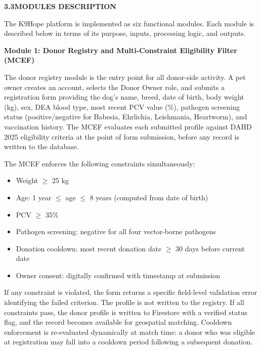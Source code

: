 \documentclass[12pt,a4paper]{article}
\begin{document}
\vspace{2em}
\noindent\textbf{3.3\quad MODULES DESCRIPTION}
\vspace{0.8em}

\noindent The K9Hope platform is implemented as six functional modules. Each module is described below in terms of its purpose, inputs, processing logic, and outputs.

\vspace{1em}
\noindent\textbf{Module 1: Donor Registry and Multi-Constraint Eligibility Filter (MCEF)}
\vspace{0.5em}

\noindent The donor registry module is the entry point for all donor-side activity. A pet owner creates an account, selects the Donor Owner role, and submits a registration form providing the dog's name, breed, date of birth, body weight (kg), sex, DEA blood type, most recent PCV value (\%), pathogen screening status (positive/negative for Babesia, Ehrlichia, Leishmania, Heartworm), and vaccination history. The MCEF evaluates each submitted profile against DAHD 2025 eligibility criteria at the point of form submission, before any record is written to the database.

\noindent The MCEF enforces the following constraints simultaneously:

\begin{itemize}[leftmargin=1.5em, itemsep=0.3em]
    \item Weight $\geq$ 25 kg
    \item Age: 1 year $\leq$ age $\leq$ 8 years (computed from date of birth)
    \item PCV $\geq$ 35\%
    \item Pathogen screening: negative for all four vector-borne pathogens
    \item Donation cooldown: most recent donation date $\geq$ 30 days before current date
    \item Owner consent: digitally confirmed with timestamp at submission
\end{itemize}

\noindent If any constraint is violated, the form returns a specific field-level validation error identifying the failed criterion. The profile is not written to the registry. If all constraints pass, the donor profile is written to Firestore with a verified status flag, and the record becomes available for geospatial matching. Cooldown enforcement is re-evaluated dynamically at match time: a donor who was eligible at registration may fall into a cooldown period following a subsequent donation.
\end{document}
